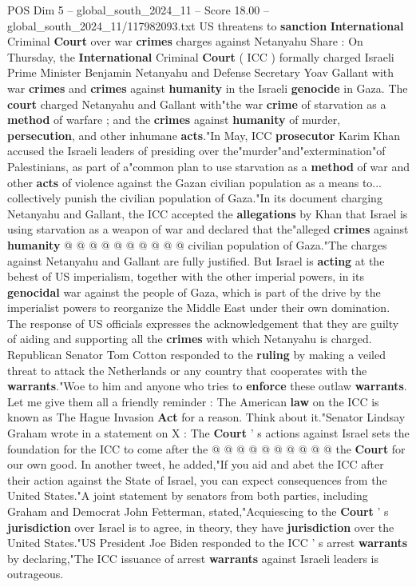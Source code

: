 \begin{textsample}{POS Dim 5 – global\_south\_2024\_11 – Score 18.00 – global\_south\_2024\_11/117982093.txt}  \label{ex:f5_pos_027}
US threatens to \textbf{sanction} \textbf{International} Criminal \textbf{Court} over war \textbf{crimes} charges against Netanyahu Share : On Thursday, the \textbf{International} Criminal \textbf{Court} ( ICC ) formally charged Israeli Prime Minister Benjamin Netanyahu and Defense Secretary Yoav Gallant with war \textbf{crimes} and \textbf{crimes} against \textbf{humanity} in the Israeli \textbf{genocide} in Gaza.
The \textbf{court} charged Netanyahu and Gallant with"the war \textbf{crime} of starvation as a \textbf{method} of warfare ; and the \textbf{crimes} against \textbf{humanity} of murder, \textbf{persecution}, and other inhumane \textbf{acts}."In May, ICC \textbf{prosecutor} Karim Khan accused the Israeli leaders of presiding over the"murder"and"extermination"of Palestinians, as part of a"common plan to use starvation as a \textbf{method} of war and other \textbf{acts} of violence against the Gazan civilian population as a means to... collectively punish the civilian population of Gaza."In its document charging Netanyahu and Gallant, the ICC accepted the \textbf{allegations} by Khan that Israel is using starvation as a weapon of war and declared that the"alleged \textbf{crimes} against \textbf{humanity} @ @ @ @ @ @ @ @ @ @ civilian population of Gaza."The charges against Netanyahu and Gallant are fully justified.
But Israel is \textbf{acting} at the behest of US imperialism, together with the other imperial powers, in its \textbf{genocidal} war against the people of Gaza, which is part of the drive by the imperialist powers to reorganize the Middle East under their own domination.
The response of US officials expresses the acknowledgement that they are guilty of aiding and supporting all the \textbf{crimes} with which Netanyahu is charged.
Republican Senator Tom Cotton responded to the \textbf{ruling} by making a veiled threat to attack the Netherlands or any country that cooperates with the \textbf{warrants}."Woe to him and anyone who tries to \textbf{enforce} these outlaw \textbf{warrants}.
Let me give them all a friendly reminder : The American \textbf{law} on the ICC is known as The Hague Invasion \textbf{Act} for a reason.
Think about it."Senator Lindsay Graham wrote in a statement on X : The \textbf{Court} ' s actions against Israel sets the foundation for the ICC to come after the @ @ @ @ @ @ @ @ @ @ the \textbf{Court} for our own good.
In another tweet, he added,"If you aid and abet the ICC after their action against the State of Israel, you can expect consequences from the United States."A joint statement by senators from both parties, including Graham and Democrat John Fetterman, stated,"Acquiescing to the \textbf{Court} ' s \textbf{jurisdiction} over Israel is to agree, in theory, they have \textbf{jurisdiction} over the United States."US President Joe Biden responded to the ICC ' s arrest \textbf{warrants} by declaring,"The ICC issuance of arrest \textbf{warrants} against Israeli leaders is outrageous.

\end{textsample}
